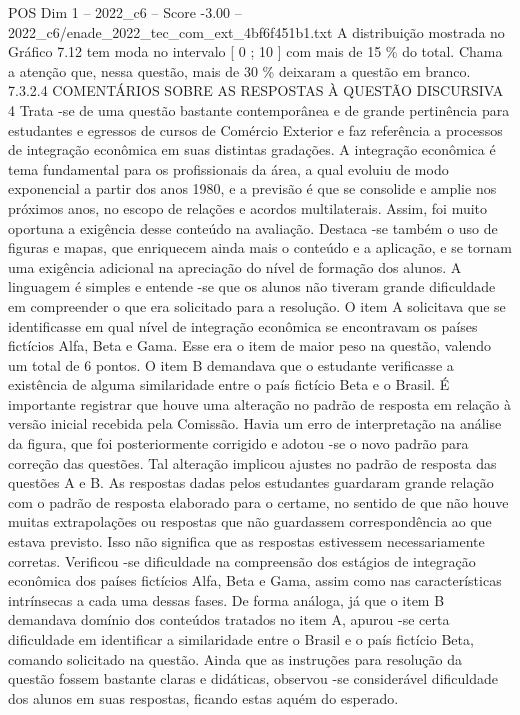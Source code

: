 \begin{textsample}{POS Dim 1 – 2022\_c6 – Score -3.00 – 2022\_c6/enade\_2022\_tec\_com\_ext\_4bf6f451b1.txt}
A distribuição mostrada no Gráfico 7.12 tem moda no intervalo [ 0 ; 10 ] com mais de 15 \% do total.
Chama a atenção que, nessa questão, mais de 30 \% deixaram a questão em branco. 7.3.2.4 COMENTÁRIOS SOBRE AS RESPOSTAS À QUESTÃO DISCURSIVA 4 Trata -se de uma questão bastante contemporânea e de grande pertinência para estudantes e egressos de cursos de Comércio Exterior e faz referência a processos de integração econômica em suas distintas gradações.
A integração econômica é tema fundamental para os profissionais da área, a qual evoluiu de modo exponencial a partir dos anos 1980, e a previsão é que se consolide e amplie nos próximos anos, no escopo de relações e acordos multilaterais.
Assim, foi muito oportuna a exigência desse conteúdo na avaliação.
Destaca -se também o uso de figuras e mapas, que enriquecem ainda mais o conteúdo e a aplicação, e se tornam uma exigência adicional na apreciação do nível de formação dos alunos.
A linguagem é simples e entende -se que os alunos não tiveram grande dificuldade em compreender o que era solicitado para a resolução.
O item A solicitava que se identificasse em qual nível de integração econômica se encontravam os países fictícios Alfa, Beta e Gama.
Esse era o item de maior peso na questão, valendo um total de 6 pontos.
O item B demandava que o estudante verificasse a existência de alguma similaridade entre o país fictício Beta e o Brasil.
É importante registrar que houve uma alteração no padrão de resposta em relação à versão inicial recebida pela Comissão.
Havia um erro de interpretação na análise da figura, que foi posteriormente corrigido e adotou -se o novo padrão para correção das questões.
Tal alteração implicou ajustes no padrão de resposta das questões A e B.
As respostas dadas pelos estudantes guardaram grande relação com o padrão de resposta elaborado para o certame, no sentido de que não houve muitas extrapolações ou respostas que não guardassem correspondência ao que estava previsto.
Isso não significa que as respostas estivessem necessariamente corretas.
Verificou -se dificuldade na compreensão dos estágios de integração econômica dos países fictícios Alfa, Beta e Gama, assim como nas características intrínsecas a cada uma dessas fases.
De forma análoga, já que o item B demandava domínio dos conteúdos tratados no item A, apurou -se certa dificuldade em identificar a similaridade entre o Brasil e o país fictício Beta, comando solicitado na questão.
Ainda que as instruções para resolução da questão fossem bastante claras e didáticas, observou -se considerável dificuldade dos alunos em suas respostas, ficando estas aquém do esperado.

\end{textsample}
